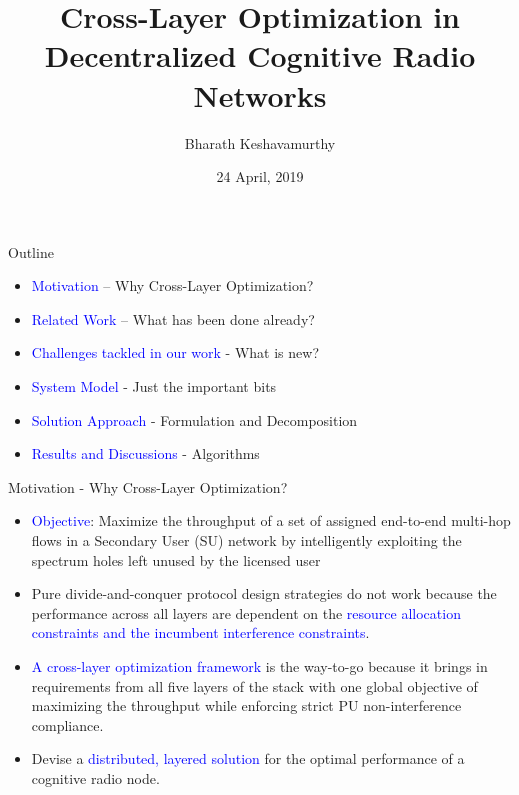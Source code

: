\documentclass{beamer}
\title[Your Short Title]{Cross-Layer Optimization in Decentralized Cognitive Radio Networks}
\author{Bharath Keshavamurthy}
\institute{School of Electrical and Computer Engineering, Purdue University}
\date{24 April, 2019}
\begin{document}
\begin{frame}
  \titlepage
\end{frame}
\begin{frame}{Outline}
  \tableofcontents
  \begin{itemize}
      \item \textcolor{blue}{Motivation} – Why Cross-Layer Optimization?
      \item \textcolor{blue}{Related Work} – What has been done already?
      \item \textcolor{blue}{Challenges tackled in our work} - What is new?
      \item \textcolor{blue}{System Model} - Just the important bits
      \item \textcolor{blue}{Solution Approach} - Formulation and Decomposition
      \item \textcolor{blue}{Results and Discussions} - Algorithms
  \end{itemize}
\vskip 1cm
\end{frame}
\begin{frame}{Motivation - Why Cross-Layer Optimization?}
\begin{itemize}
  \item \textcolor{blue}{Objective}: Maximize the throughput of a set of assigned end-to-end multi-hop flows in a Secondary User (SU) network by intelligently exploiting the spectrum holes left unused by the licensed user
  \item Pure divide-and-conquer protocol design strategies do not work because the performance across all layers are dependent on the \textcolor{blue}{resource allocation constraints and the incumbent interference constraints}.
  \item \textcolor{blue}{A cross-layer optimization framework} is the way-to-go because it brings in requirements from all five layers of the stack with one global objective of maximizing the throughput while enforcing strict PU non-interference compliance.
  \item Devise a \textcolor{blue}{distributed, layered solution} for the optimal performance of a cognitive radio node.
\end{itemize}
\vskip 1cm
\end{frame}
\end{document}
